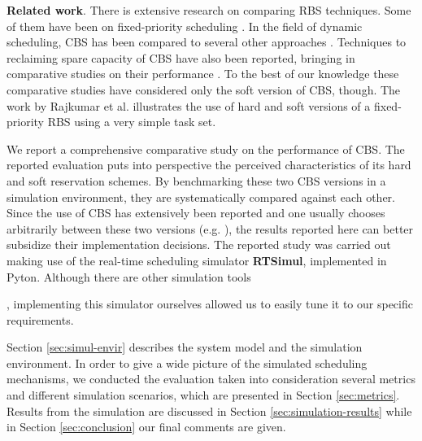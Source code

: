 \documentclass[times, 10pt,twocolumn]{article}
\newcounter{notecounter}
\newcommand{\nota}[1]{\addtocounter{notecounter}{1}{\textcolor{red}{[nota
      \arabic{notecounter}: #1]}}}
\newcommand{\simul}{\textbf{RTSimul}} %
\begin{document}
\textbf{Related work}. There is extensive research on comparing RBS
techniques.  Some of them have been on fixed-priority scheduling
\cite{bernat.ea99:new,bernat.ea02:multiple,davis.ea05:hierarchical,davis.ea95:dual}.
In the field of dynamic scheduling, CBS has been compared to several
other approaches \cite{spuri.ea96:scheduling}.  Techniques to
reclaiming spare capacity of CBS have also been reported, bringing in
comparative studies on their performance
\cite{caccamo.ea00:capacity,lin.ea05:improving}. To the best of our
knowledge these comparative studies have considered only the soft
version of CBS, though.  The work by Rajkumar et
al. \cite{rajkumar.ea01:resource} illustrates the use of hard and soft
versions of a fixed-priority RBS using a very simple task set.

\label{sec:contr-this-paper}

We report a comprehensive comparative study on the performance of
CBS. The reported evaluation puts into perspective the perceived
characteristics of its hard and soft reservation schemes.  By
benchmarking these two CBS versions in a simulation environment, they
are systematically compared against each other.  Since the use of CBS
has extensively been reported and one usually chooses arbitrarily
between these two versions
(e.g. \cite{abeni.ea99:adaptive,abeni.ea05:qos}), the results reported
here can better subsidize their implementation decisions.  The
reported study was carried out making use of the real-time scheduling
simulator \simul{}, implemented in Pyton. Although there are other
simulation tools \nota{citar simTools}, implementing this simulator
ourselves allowed us to easily tune it to our specific requirements.

\label{sec:structure-this-paper}

Section \ref{sec:simul-envir} describes the system model and the
simulation environment.  In order to give a wide picture of the
simulated scheduling mechanisms, we conducted the evaluation taken
into consideration several metrics and different simulation scenarios,
which are presented in Section \ref{sec:metrics}. Results from the
simulation are discussed in Section \ref{sec:simulation-results} while
in Section \ref{sec:conclusion} our final comments are given.

\label{sec:simul-envir}
\end{document}
